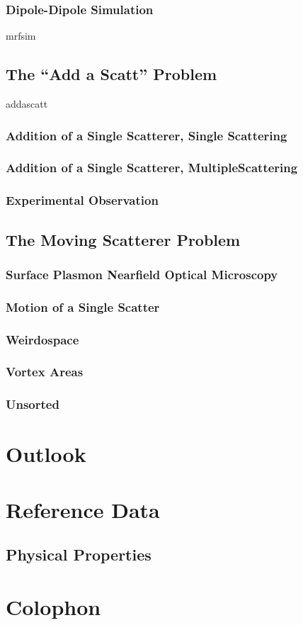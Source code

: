 \documentclass[a4paper,titlepage,onecolumn]{report}
\begin{document}
  \subsection{Dipole-Dipole Simulation} \label{sec:mrfsim}
		{mrfsim}
 \section{The ``Add a Scatt'' Problem}
	{addascatt}
  \subsection{Addition of a Single Scatterer, Single Scattering}
  \subsection{Addition of a Single Scatterer, MultipleScattering}
  \subsection{Experimental Observation}
 \section{The Moving Scatterer Problem}
  \subsection{Surface Plasmon Nearfield Optical Microscopy}
  \subsection{Motion of a Single Scatter}
  \subsection{Weirdospace}
  \subsection{Vortex Areas}
  \subsection{Unsorted}

\chapter{Outlook} \label{ch:outlook}

\chapter{Reference Data} \label{ch:reference}
\section{Physical Properties}
\label{ref:physicalproperties}
\chapter{Colophon}



\end{document}
